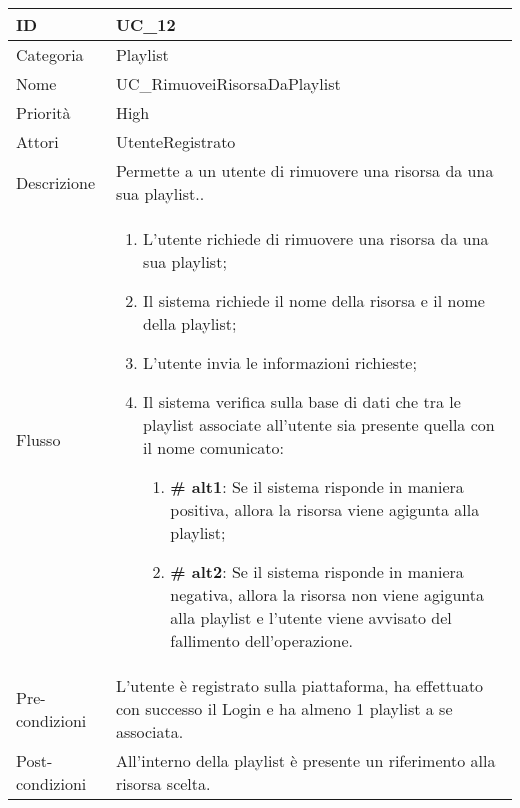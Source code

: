 \begin{center}
\begin{tabular}{ |p{2cm}|p{13cm}|  }
\hline
ID & UC\_12 \\\hline
Categoria & Playlist\\\hline
Nome & UC\_RimuoveiRisorsaDaPlaylist\\\hline
Priorità & High \\\hline
Attori &  UtenteRegistrato \\\hline
Descrizione & Permette a un utente di rimuovere una risorsa da una sua playlist..\\\hline
Flusso &  	\begin{enumerate}
			\item L'utente richiede di rimuovere una risorsa da una sua playlist;
			\item Il sistema richiede il nome della risorsa e il nome della playlist;
			\item L'utente invia le informazioni richieste;
			\item Il sistema verifica sulla base di dati che tra le playlist associate all'utente sia presente quella con il nome comunicato:
			\begin{enumerate}[  ]
				\item \textbf{\# alt1}: Se il sistema risponde in maniera positiva, allora la risorsa viene agigunta alla playlist;
				\item \textbf{\# alt2}: Se il sistema risponde in maniera negativa, allora la risorsa non viene  agigunta alla playlist e l'utente viene avvisato del fallimento dell'operazione.
			\end{enumerate}
		\end{enumerate}\\\hline
Pre-condizioni & L'utente è registrato sulla piattaforma, ha effettuato con successo il Login e ha almeno 1 playlist a se associata.\\\hline
Post-condizioni & All'interno della playlist è presente un riferimento alla risorsa scelta.\\\hline
\end{tabular}
\label{table_use_case:12}\newline


\end{center}
